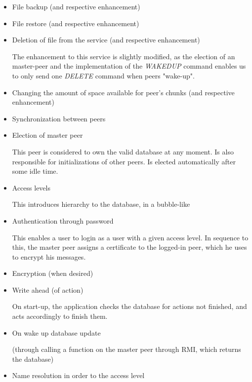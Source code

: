\documentclass[a4paper]{article}
\begin{document}
\begin{itemize}

\item File backup (and respective enhancement)

\item File restore (and respective enhancement)

\item Deletion of file from the service (and respective enhancement)

The enhancement to this service is slightly modified, as the election of an master-peer and the implementation of the \textit{WAKEDUP} command enables us to only send one \textit{DELETE} command when peers "wake-up".

\item Changing the amount of space available for peer's chunks (and respective enhancement)

\item Synchronization between peers

\item Election of master peer

This peer is considered to own the valid database at any moment. Is also responsible for initializations of other peers. Is elected automatically after some idle time.

\item Access levels

This introduces hierarchy to the database, in a bubble-like 

\item Authentication through password

This enables a user to login as a user with a given access level. In sequence to this, the master peer assigns a certificate to the logged-in peer, which he uses to encrypt his messages.

\item Encryption (when desired)

\item Write ahead (of action)

On start-up, the application checks the database for actions not finished, and acts accordingly to finish them.

\item On wake up database update

(through calling a function on the master peer through RMI, which returns the database)

\item Name resolution in order to the access level

\end{itemize}
\end{document}
